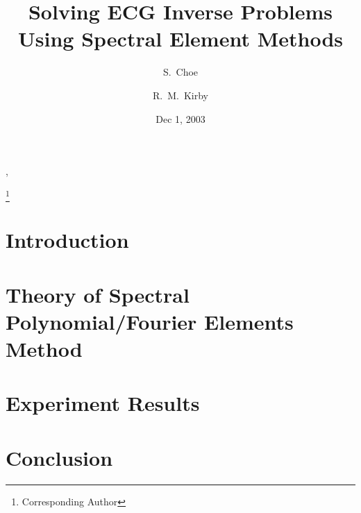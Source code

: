 \documentclass{elsart}
\begin{document}
\begin{frontmatter}
\title{Solving ECG Inverse Problems Using Spectral Element Methods}


\author[addr1]{S.\ Choe},
\author[addr1]{R.\ M.\ Kirby }


\address[addr1]{School of Computing, Univ.\ of Utah, Salt Lake City, Utah, USA.}

\thanks[corresp]{Corresponding Author}
\date{Dec 1, 2003}


\begin{abstract}

\end{abstract}

\end{frontmatter}

\maketitle
{}




\section{Introduction}
%

\section{Theory of Spectral Polynomial/Fourier Elements Method}
%




\section{Experiment Results}
%
%



\section{Conclusion}
%



%

%
\end{document}
